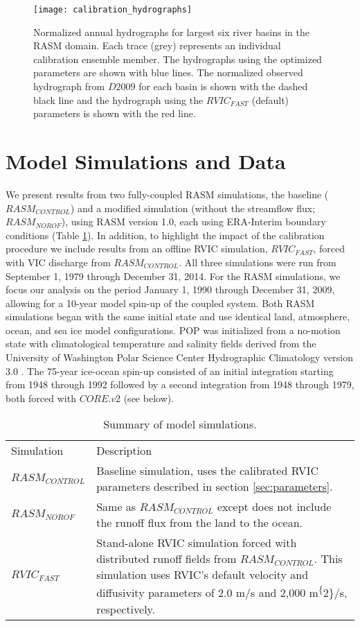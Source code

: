 \begin{figure}
    \centering
    \texttt{[image: calibration\_hydrographs]}
    \caption{Normalized annual hydrographs for largest six river basins in the RASM domain.
    Each trace (grey) represents an individual calibration ensemble member.
    The hydrographs using the optimized parameters are shown with blue lines.
    The normalized observed hydrograph from $D2009$ for each basin is shown with the dashed black line and the hydrograph using the $RVIC_{FAST}$ (default) parameters is shown with the red line.}
    \label{fig:calibration_hydrographs}
\end{figure}

\section{Model Simulations and Data}
\label{sec:data_ch4}

We present results from two fully-coupled RASM simulations, the baseline ($RASM_{CONTROL}$) and a modified simulation (without the streamflow flux; $RASM_{NOROF}$), using RASM version 1.0, each using ERA-Interim boundary conditions (Table \ref{table:simulations}).
In addition, to highlight the impact of the calibration procedure we include results from an offline RVIC simulation, $RVIC_{FAST}$, forced with VIC discharge from $RASM_{CONTROL}$.
All three simulations were run from September 1, 1979 through December 31, 2014.
For the RASM simulations, we focus our analysis on the period January 1, 1990 through December 31, 2009, allowing for a 10-year model spin-up of the coupled system.
Both RASM simulations began with the same initial state \citep[see ][]{Hamman_2016a} and use identical land, atmosphere, ocean, and sea ice model configurations.
POP was initialized from a no-motion state with climatological temperature and salinity fields derived from the University of Washington Polar Science Center Hydrographic Climatology version 3.0 \citep{Steele_2001}.
The 75-year ice-ocean spin-up consisted of an initial integration starting from 1948 through 1992 followed by a second integration from 1948 through 1979, both forced with $CORE.v2$ (see below).

\begin{table}[]
  \caption{Summary of model simulations.}
  \label{table:simulations}
  \begin{tabular}{l|p{4in}}
  Simulation       & Description \\
  $RASM_{CONTROL}$ & Baseline simulation, uses the calibrated RVIC parameters described in section \ref{sec:parameters}. \\
  $RASM_{NOROF}$   & Same as $RASM_{CONTROL}$ except does not include the runoff flux from the land to the ocean. \\
  $RVIC_{FAST}$    & Stand-alone RVIC simulation forced with distributed runoff fields from $RASM_{CONTROL}$. This simulation uses RVIC's default velocity and diffusivity parameters of 2.0 m/s and 2,000 m\textsuperscript\{2\}/s, respectively.
  \end{tabular}
\end{table}


